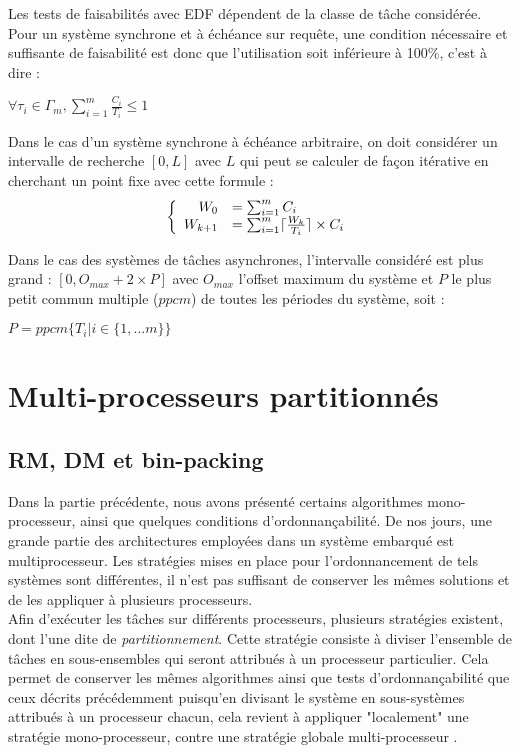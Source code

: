 \documentclass[11pt,a4paper,oneside]{report}
\begin{document}
Les tests de faisabilités avec EDF dépendent de la classe de tâche considérée. 
Pour un système synchrone et à échéance sur requête, 
une condition nécessaire et suffisante de faisabilité est donc que l'utilisation soit inférieure 
à 100\%, c'est à dire : \\
\begin{center}
	$\forall \tau_i \in \Gamma_m, \sum_{i=1}^{m}\frac{C_i}{T_i} \leq 1 $
\end{center}

Dans le cas d'un système synchrone à échéance arbitraire, on doit considérer un intervalle de 
recherche $[0, L]$ avec $L$ qui peut se calculer de façon itérative en cherchant un point fixe 
avec cette formule : \\
\[
\left \{
\begin{array}{r l}
W_0 &= \sum_{i = 1}^{m}C_i\\
W_{k+1} & =\sum_{i = 1}^{m} \lceil \frac{W_k}{T_i} \rceil \times C_i
\end{array}
\right.
\]

Dans le cas des systèmes de tâches asynchrones, l'intervalle considéré est plus grand : 
$[0, O_{max} + 2 \times P]$ avec $O_{max}$ l'offset maximum du système et 
$P$ le plus petit commun multiple ($ppcm$) de toutes les périodes du système, soit : \\
\begin{center}
	$P = ppcm\{T_i | i \in \{1, ... m\}\}$
\end{center}

\section{Multi-processeurs partitionnés}

\subsection{RM, DM et bin-packing}
Dans la partie précédente, nous avons présenté certains algorithmes mono-processeur, 
ainsi que quelques conditions d'ordonnançabilité.
De nos jours, une grande partie des architectures employées dans un système embarqué 
est multiprocesseur. Les stratégies mises en place pour l'ordonnancement de tels 
systèmes sont différentes, il n'est pas suffisant de conserver les mêmes solutions 
et de les appliquer à plusieurs processeurs.\\
 
Afin d'exécuter les tâches sur différents processeurs, plusieurs stratégies existent, 
dont l'une dite de \textit{partitionnement}. 
Cette stratégie consiste à diviser l'ensemble de tâches en sous-ensembles qui seront 
attribués à un processeur particulier. Cela permet de conserver les mêmes algorithmes ainsi 
que tests d'ordonnançabilité que ceux 
décrits précédemment puisqu'en divisant le système en sous-systèmes attribués à un 
processeur chacun, cela revient à appliquer "localement" une stratégie mono-processeur, contre 
une stratégie globale multi-processeur \cite{ndoye_ordonnancement_2014}.
\end{document}
